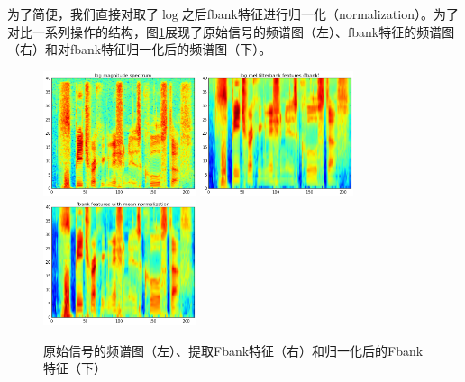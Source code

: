 为了简便，我们直接对取了$\log$之后fbank特征进行归一化（normalization）。为了对比一系列操作的结构，图\ref{fig:fbank-normalization}展现了原始信号的频谱图（左）、fbank特征的频谱图（右）和对fbank特征归一化后的频谱图（下）。
\begin{figure}[!ht]
	\centering
	\includegraphics[width=0.40\textwidth]{figure/log-power}
	\hspace{0.5cm}
	\includegraphics[width=0.40\textwidth]{figure/log-mel-fbank}
	\hspace{0.5cm}
	\includegraphics[width=0.40\textwidth]{figure/log-mel-fbank-norm}
	\caption{原始信号的频谱图（左）、提取Fbank特征（右）和归一化后的Fbank特征（下）}
\label{fig:fbank-normalization}
\end{figure}
